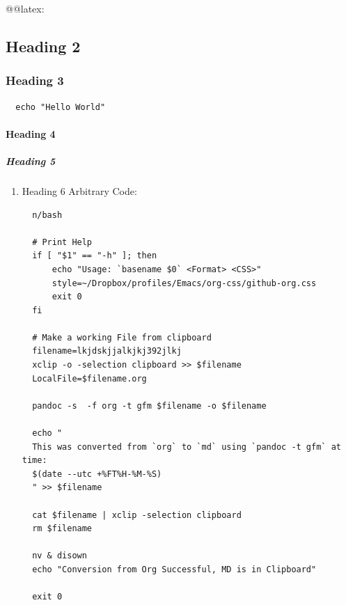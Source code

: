 \documentclass[11pt]{article}
\begin{document}
@@latex: 



\subsection{Heading 2}
\label{heading-2}
\subsubsection{Heading 3}
\label{heading-3}
\lstset{language=sh,label= ,caption= ,captionpos=b,numbers=none}
\begin{lstlisting}
  echo "Hello World"
\end{lstlisting}


\paragraph{Heading 4}
\label{heading-4}
\subparagraph{Heading 5}
\label{heading-5}
\begin{enumerate}
\item Heading 6
\label{heading-6}
Arbitrary Code:

\lstset{language=sh,label= ,caption= ,captionpos=b,numbers=none}
\begin{lstlisting}
  n/bash

  # Print Help
  if [ "$1" == "-h" ]; then
      echo "Usage: `basename $0` <Format> <CSS>"
      style=~/Dropbox/profiles/Emacs/org-css/github-org.css
      exit 0
  fi

  # Make a working File from clipboard
  filename=lkjdskjjalkjkj392jlkj
  xclip -o -selection clipboard >> $filename
  LocalFile=$filename.org

  pandoc -s  -f org -t gfm $filename -o $filename

  echo "
  This was converted from `org` to `md` using `pandoc -t gfm` at time:
  $(date --utc +%FT%H-%M-%S)
  " >> $filename

  cat $filename | xclip -selection clipboard
  rm $filename

  nv & disown
  echo "Conversion from Org Successful, MD is in Clipboard"

  exit 0
\end{lstlisting}
\end{enumerate}
\end{document}
